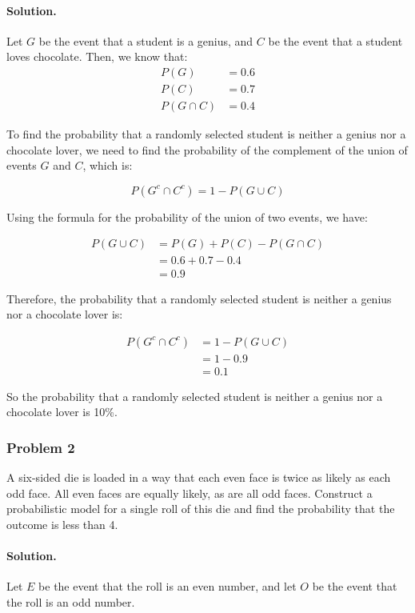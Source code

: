 \paragraph{Solution.} Let $G$ be the event that a student is a genius, and $C$ be the event that a student loves chocolate.
Then, we know that:
\begin{align*}
    P(G)        & = 0.6 \\
    P(C)        & = 0.7 \\
    P(G \cap C) & = 0.4
\end{align*}

To find the probability that a randomly selected student is neither a genius nor a chocolate lover, we need to find the probability of the complement of the union of events $G$ and $C$, which is:

$$P(G^c \cap C^c) = 1 - P(G \cup C)$$

Using the formula for the probability of the union of two events, we have:

\begin{align*}
    P(G \cup C) & = P(G) + P(C) - P(G \cap C) \\
                & = 0.6 + 0.7 - 0.4           \\
                & = 0.9
\end{align*}

Therefore, the probability that a randomly selected student is neither a genius nor a chocolate lover is:

\begin{align*}
    P(G^c \cap C^c) & = 1 - P(G \cup C) \\
                    & = 1 - 0.9         \\
                    & = 0.1
\end{align*}

So the probability that a randomly selected student is neither a genius nor a chocolate lover is 10\%.

\newpage
\subsubsection{Problem 2} A six-sided die is loaded in a way that each even face is twice as likely as each odd face. All even faces are equally likely, as are all odd faces. Construct a probabilistic model for a single roll of this die and find the probability that the outcome is less than 4.
\paragraph{Solution.} Let $E$ be the event that the roll is an even number, and let $O$ be the event that the roll is an odd number.

